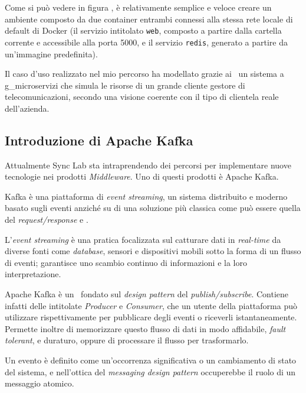 Come si può vedere in figura \thefigure, è relativamente semplice e veloce creare un ambiente composto da due container entrambi connessi alla stessa rete locale di default di Docker (il servizio intitolato \texttt{web}, composto a partire dalla cartella corrente e accessibile alla porta 5000, e il servizio \texttt{redis}, generato a partire da un'immagine predefinita).

Il caso d'uso realizzato nel mio percorso ha modellato grazie ai \container\ un sistema a \gls{g_microservizi} che simula le risorse di un grande cliente gestore di telecomunicazioni, secondo una visione coerente con il tipo di clientela reale dell'azienda.

\subsection{Introduzione di Apache Kafka}

Attualmente Sync Lab sta intraprendendo dei percorsi per implementare nuove tecnologie nei prodotti \textit{Middleware}.
Uno di questi prodotti è Apache Kafka.

Kafka è una piattaforma di \textit{event streaming}, un sistema distribuito e moderno basato sugli eventi anziché su di una soluzione più classica come può essere quella del \textit{request/response} e .

L'\textit{event streaming} è una pratica focalizzata sul catturare dati in \textit{real-time} da diverse fonti come \textit{database}, sensori e dispositivi mobili sotto la forma di un flusso di eventi; garantisce uno scambio continuo di informazioni e la loro interpretazione.

Apache Kafka è un \software\ fondato sul \textit{design pattern} del \textit{publish/subscribe}.
Contiene infatti delle  intitolate \textit{Producer} e \textit{Consumer}, che un utente della piattaforma può utilizzare rispettivamente per pubblicare degli eventi o riceverli istantaneamente.
Permette inoltre di memorizzare questo flusso di dati in modo affidabile, \textit{fault tolerant}, e duraturo, oppure di processare il flusso per trasformarlo.

Un evento è definito come un'occorrenza significativa o un cambiamento di stato del sistema, e nell'ottica del \textit{messaging design pattern} occuperebbe il ruolo di un messaggio atomico.

